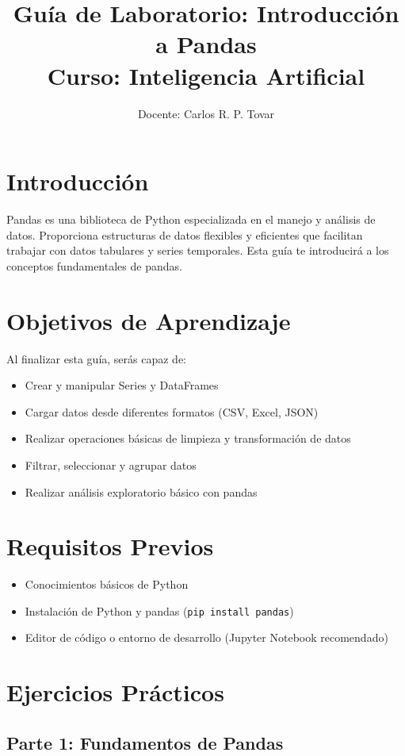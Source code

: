 \documentclass[a4paper,12pt]{article}
\title{\textbf{Guía de Laboratorio: Introducción a Pandas} \\ Curso: Inteligencia Artificial}
\author{Docente: Carlos R. P. Tovar}
\date{}
\begin{document}
\maketitle

\section{Introducción}
Pandas es una biblioteca de Python especializada en el manejo y análisis de datos. Proporciona estructuras de datos flexibles y eficientes que facilitan trabajar con datos tabulares y series temporales. Esta guía te introducirá a los conceptos fundamentales de pandas.

\section{Objetivos de Aprendizaje}
Al finalizar esta guía, serás capaz de:
\begin{itemize}
    \item Crear y manipular Series y DataFrames
    \item Cargar datos desde diferentes formatos (CSV, Excel, JSON)
    \item Realizar operaciones básicas de limpieza y transformación de datos
    \item Filtrar, seleccionar y agrupar datos
    \item Realizar análisis exploratorio básico con pandas
\end{itemize}

\section{Requisitos Previos}
\begin{itemize}
    \item Conocimientos básicos de Python
    \item Instalación de Python y pandas (\texttt{pip install pandas})
    \item Editor de código o entorno de desarrollo (Jupyter Notebook recomendado)
\end{itemize}

\section{Ejercicios Prácticos}

\subsection{Parte 1: Fundamentos de Pandas}
\end{document}
